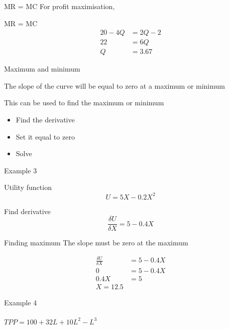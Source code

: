 \documentclass[14pt,xcolor=pdftex,dvipsnames,table, handout]{beamer}
\begin{document}
\begin{frame}{MR = MC}
For profit maximisation, 
\begin{block}{MR = MC}
\begin{align*}
20 - 4Q &= 2Q - 2\\
22 &= 6Q\\
Q &= 3.67
\end{align*}
\end{block}
\end{frame}

\begin{frame}{Maximum and minimum}
\begin{block}{}
The slope of the curve will be equal to zero at a maximum or minimum
\end{block}
\pause
This can be used to find the maximum or minimum
\pause
\begin{itemize}[<+-| alert@+>]
\item Find the derivative
\item Set it equal to zero
\item Solve
\end{itemize}
\end{frame}

\begin{frame}{Example 3}
\begin{block}{Utility function}
\begin{equation*}
U = 5X - 0.2X^2
\end{equation*}
\end{block}
\begin{block}{Find derivative}
\begin{equation*}
\frac{\delta U}{\delta X} = 5 - 0.4X
\end{equation*}
\end{block}
\end{frame}

\begin{frame}{Finding maximum}
The slope must be zero at the maximum
\pause
\begin{block}{}
\begin{align*}
\frac{\delta U}{\delta X} &= 5 - 0.4X\\
0 &= 5 - 0.4X\\
0.4X &= 5\\
X = 12.5
\end{align*}
\end{block}
\end{frame}

\begin{frame}{Example 4}
\framesubtitle{$TPP  = 100 + 32L + 10L^2 - L^3$}
\end{frame}
\end{document}
